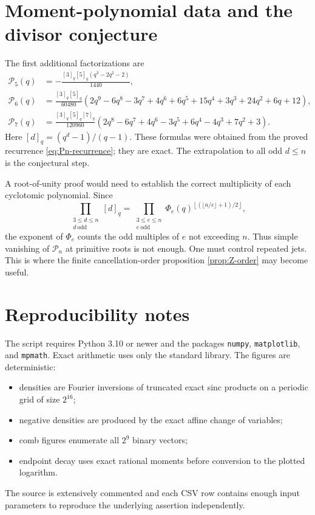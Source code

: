 \documentclass[11pt,oneside]{article}
\numberwithin{equation}{section}
\theoremstyle{definition}
\theoremstyle{remark}
\newcommand{\e}{\mathrm e}
\begin{document}
\section{Moment-polynomial data and the divisor conjecture}
\label{app:Pn-data}

The first additional factorizations are
\begin{align}
 \mathcal P_5(q)
 &=-\frac{[3]_q[5]_q
 (q^3-2q^2-2)}{1440},
 \label{eq:P5-factor}\\
 \mathcal P_6(q)
 &=\frac{[3]_q[5]_q}{60480}
 \left(
 2q^9-6q^8-3q^7+4q^6+6q^5+15q^4
 +3q^3+24q^2+6q+12
 \right),
 \label{eq:P6-factor}\\
 \mathcal P_7(q)
 &=\frac{[3]_q[5]_q[7]_q}{120960}
 \left(
 2q^8-6q^7+4q^6-3q^5+6q^4-4q^3+7q^2+3
 \right).
 \label{eq:P7-factor}
\end{align}
Here $[d]_q=(q^d-1)/(q-1)$.  These formulas were obtained from the proved
recurrence \eqref{eq:Pn-recurrence}; they are exact.  The extrapolation to all
odd $d\le n$ is the conjectural step.

A root-of-unity proof would need to establish the correct multiplicity of each
cyclotomic polynomial.  Since
\[
 \prod_{\substack{3\le d\le n\\d\ \mathrm{odd}}}[d]_q
 =\prod_{\substack{3\le e\le n\\e\ \mathrm{odd}}}
 \Phi_e(q)^{\left\lfloor(\lfloor n/e\rfloor+1)/2\right\rfloor},
\]
the exponent of $\Phi_e$ counts the odd multiples of $e$ not exceeding $n$.
Thus simple vanishing of $\mathcal P_n$ at primitive roots is not enough.  One
must control repeated jets.  This is where the finite cancellation-order proposition
\ref{prop:Z-order} may become useful.

\section{Reproducibility notes}
\label{app:reproducibility}

The script requires Python 3.10 or newer and the packages
\texttt{numpy}, \texttt{matplotlib}, and \texttt{mpmath}.  Exact arithmetic
uses only the standard library.  The figures are deterministic:
\begin{itemize}
\item densities are Fourier inversions of truncated exact sinc products on a
      periodic grid of size $2^{16}$;
\item negative densities are produced by the exact affine change of variables;
\item comb figures enumerate all $2^9$ binary vectors;
\item endpoint decay uses exact rational moments before conversion to the
      plotted logarithm.
\end{itemize}
The source is extensively commented and each CSV row contains enough input
parameters to reproduce the underlying assertion independently.
\end{document}
